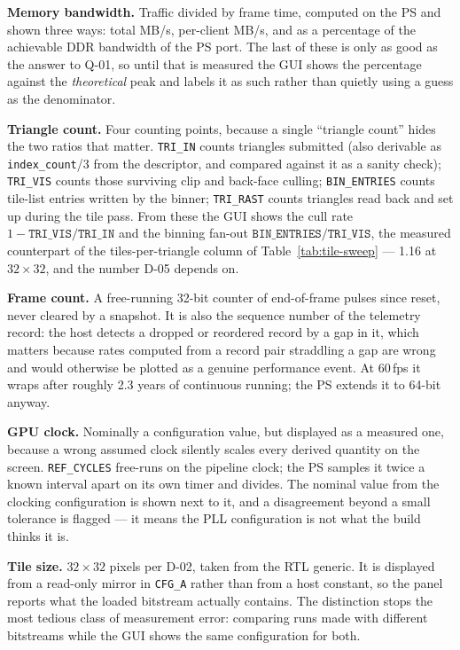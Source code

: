 \documentclass[11pt,a4paper]{article}
\newcommand{\field}[1]{\textbf{#1}\quad}
\begin{document}
\field{Memory bandwidth.} Traffic divided by frame time, computed on the PS and
shown three ways: total MB/s, per-client MB/s, and as a percentage of the
achievable DDR bandwidth of the PS port. The last of these is only as good as
the answer to Q-01, so until that is measured the GUI shows the percentage
against the \emph{theoretical} peak and labels it as such rather than quietly
using a guess as the denominator.

\field{Triangle count.} Four counting points, because a single ``triangle
count'' hides the two ratios that matter. \texttt{TRI\_IN} counts triangles
submitted (also derivable as \texttt{index\_count}/3 from the descriptor, and
compared against it as a sanity check); \texttt{TRI\_VIS} counts those surviving
clip and back-face culling; \texttt{BIN\_ENTRIES} counts tile-list entries
written by the binner; \texttt{TRI\_RAST} counts triangles read back and set up
during the tile pass. From these the GUI shows the cull rate
$1-\texttt{TRI\_VIS}/\texttt{TRI\_IN}$ and the binning fan-out
$\texttt{BIN\_ENTRIES}/\texttt{TRI\_VIS}$, the measured counterpart of the
tiles-per-triangle column of Table~\ref{tab:tile-sweep} --- 1.16 at
$32\times32$, and the number D-05 depends on.

\field{Frame count.} A free-running 32-bit counter of end-of-frame pulses since
reset, never cleared by a snapshot. It is also the sequence number of the
telemetry record: the host detects a dropped or reordered record by a gap in it,
which matters because rates computed from a record pair straddling a gap are
wrong and would otherwise be plotted as a genuine performance event. At 60\,fps
it wraps after roughly 2.3 years of continuous running; the PS extends it to
64-bit anyway.

\field{GPU clock.} Nominally a configuration value, but displayed as a measured
one, because a wrong assumed clock silently scales every derived quantity on the
screen. \texttt{REF\_CYCLES} free-runs on the pipeline clock; the PS samples it
twice a known interval apart on its own timer and divides. The nominal value
from the clocking configuration is shown next to it, and a disagreement beyond a
small tolerance is flagged --- it means the PLL configuration is not what the
build thinks it is.

\field{Tile size.} $32\times32$ pixels per D-02, taken from the RTL generic. It
is displayed from a read-only mirror in \texttt{CFG\_A} rather than from a host
constant, so the panel reports what the loaded bitstream actually contains. The
distinction stops the most tedious class of measurement error: comparing runs
made with different bitstreams while the GUI shows the same configuration for
both.
\end{document}
